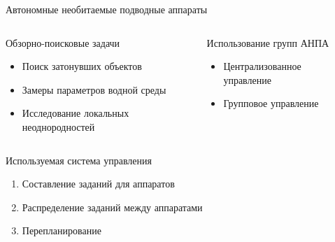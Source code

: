 \documentclass{beamer}
\begin{document}
\begin{frame}{Автономные необитаемые подводные аппараты}

 \begin{columns}[onlytextwidth, t]
    \begin{column}{0.5\textwidth}

        Обзорно-поисковые задачи
        \begin{itemize}
        \item Поиск затонувших объектов
        \item Замеры параметров водной среды
        \item Исследование локальных неоднородностей
        \end{itemize}
    \end{column}
    \begin{column}{0.5\textwidth}

        Использование групп АНПА
        \begin{itemize}
        \item Централизованное управление
        \item Групповое управление
        \end{itemize}

    \end{column}

​\end{columns}



\end{frame}

\begin{frame}{Используемая система управления}

\begin{enumerate}
\item Составление заданий для аппаратов
\item Распределение заданий между аппаратами

\item Перепланирование


\end{enumerate}
\end{frame}
\end{document}
